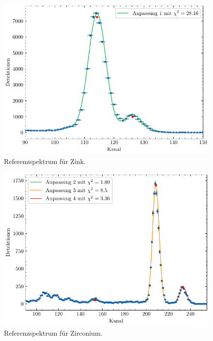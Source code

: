\begin{figure}[H]
	\centering
	\includegraphics[width=0.6\linewidth]{../figs/Zn.pdf}
	\caption{Referenzspektrum für Zink.}
	\label{fig:zn}
\end{figure}
\begin{figure}[H]
	\centering
	\includegraphics[width=0.6\linewidth]{../figs/Zr.pdf}
	\caption{Referenzspektrum für Zirconium.}
	\label{fig:zr}
\end{figure}